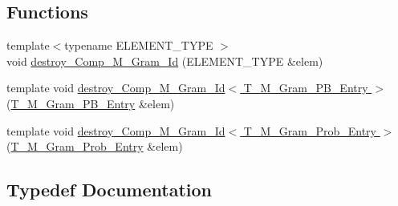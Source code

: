 \subsection*{Functions}
\begin{DoxyCompactItemize}
\item 
{\footnotesize template$<$typename E\+L\+E\+M\+E\+N\+T\+\_\+\+T\+Y\+P\+E $>$ }\\void \hyperlink{namespaceuva_1_1smt_1_1tries_1_1_____g2_d_map_trie_af98bc083f162d0805f028186f88c34f6}{destroy\+\_\+\+Comp\+\_\+\+M\+\_\+\+Gram\+\_\+\+Id} (E\+L\+E\+M\+E\+N\+T\+\_\+\+T\+Y\+P\+E \&elem)
\item 
template void \hyperlink{namespaceuva_1_1smt_1_1tries_1_1_____g2_d_map_trie_ac893da35a6076efaa0e1000020835eb1}{destroy\+\_\+\+Comp\+\_\+\+M\+\_\+\+Gram\+\_\+\+Id$<$ T\+\_\+\+M\+\_\+\+Gram\+\_\+\+P\+B\+\_\+\+Entry $>$} (\hyperlink{namespaceuva_1_1smt_1_1tries_1_1_____g2_d_map_trie_a6f09a333ff123d328ff8b0ed9eae8da3}{T\+\_\+\+M\+\_\+\+Gram\+\_\+\+P\+B\+\_\+\+Entry} \&elem)
\item 
template void \hyperlink{namespaceuva_1_1smt_1_1tries_1_1_____g2_d_map_trie_a2dc666e145275428cf4eb7f776939d14}{destroy\+\_\+\+Comp\+\_\+\+M\+\_\+\+Gram\+\_\+\+Id$<$ T\+\_\+\+M\+\_\+\+Gram\+\_\+\+Prob\+\_\+\+Entry $>$} (\hyperlink{namespaceuva_1_1smt_1_1tries_1_1_____g2_d_map_trie_ad6e10b10a0496682f0609d968d7aab2a}{T\+\_\+\+M\+\_\+\+Gram\+\_\+\+Prob\+\_\+\+Entry} \&elem)
\end{DoxyCompactItemize}


\subsection{Typedef Documentation}
\hypertarget{namespaceuva_1_1smt_1_1tries_1_1_____g2_d_map_trie_a6f09a333ff123d328ff8b0ed9eae8da3}{}
